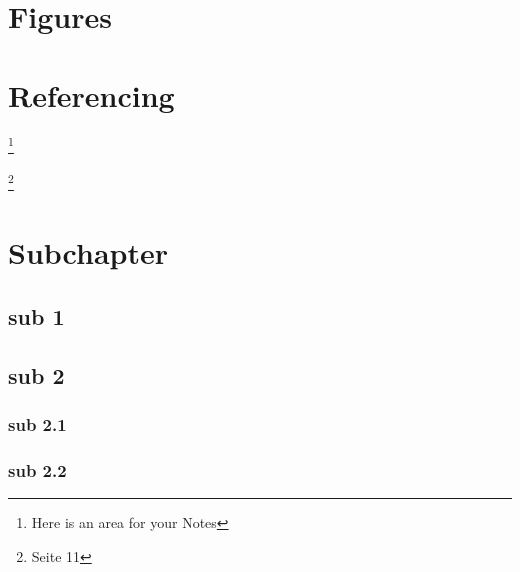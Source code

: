 \documentclass[a4paper, 12pt, oneside, BCOR1cm,toc=chapterentrywithdots]{scrbook}
\begin{document}
\chapter{Figures}

\chapter{Referencing}

\blindtext \cite{autorenrichtlinien}

\blindtext \footnote{Here is an area for your Notes}

\blindtext \footnote{\cite{lnilatex} Seite 11}
\blindtext \cite{lnilatex}
\blindtext \cite{autorenrichtlinien}


\chapter{Subchapter}

\section{sub 1}
\blindtext[3]
\section{sub 2}
\blindtext[3]
\subsection{sub 2.1}
\blindtext[3]

\subsection{sub 2.2}
\blindtext[3]





\printindex
\end{document}
